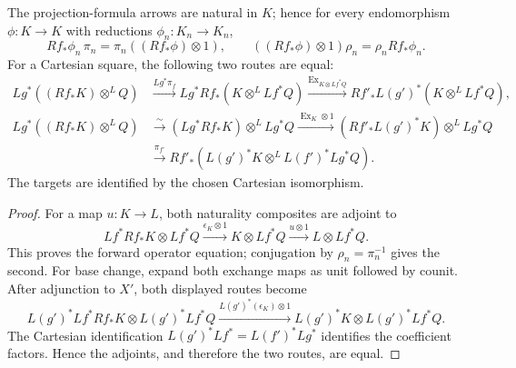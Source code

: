 \begin{lemma}
\label{lemma:weil-pbc-projection-formula-base-change-naturality}
The projection-formula arrows are natural in $K$; hence for every
endomorphism $\phi:K\to K$ with reductions $\phi_n:K_n\to K_n$,
\[
 Rf_*\phi_n\,\pi_n=\pi_n((Rf_*\phi)\otimes1),
 \qquad
 ((Rf_*\phi)\otimes1)\rho_n=\rho_nRf_*\phi_n.
\]
For a Cartesian square, the following two routes are equal:
\[
\begin{aligned}
 Lg^*((Rf_*K)\otimes^LQ)
 &\xrightarrow{Lg^*\pi_f}Lg^*Rf_*(K\otimes^LLf^*Q)
 \xrightarrow{\operatorname{Ex}_{K\otimes Lf^*Q}}
 Rf'_*L(g')^*(K\otimes^LLf^*Q),\\
 Lg^*((Rf_*K)\otimes^LQ)
 &\xrightarrow{\sim}(Lg^*Rf_*K)\otimes^LLg^*Q
 \xrightarrow{\operatorname{Ex}_K\otimes1}
 (Rf'_*L(g')^*K)\otimes^LLg^*Q\\
 &\xrightarrow{\pi_{f'}}
 Rf'_*(L(g')^*K\otimes^LL(f')^*Lg^*Q).
\end{aligned}
\]
The targets are identified by the chosen Cartesian isomorphism.
\end{lemma}
\begin{proof}
For a map $u:K\to L$, both naturality composites are adjoint to
\[
 Lf^*Rf_*K\otimes Lf^*Q
 \xrightarrow{\epsilon_K\otimes1}K\otimes Lf^*Q
 \xrightarrow{u\otimes1}L\otimes Lf^*Q.
\]
This proves the forward operator equation; conjugation by $\rho_n=\pi_n^{-1}$
gives the second.  For base change, expand both exchange maps as unit followed
by counit.  After adjunction to $X'$, both displayed routes become
\[
 L(g')^*Lf^*Rf_*K\otimes L(g')^*Lf^*Q
 \xrightarrow{L(g')^*(\epsilon_K)\otimes1}
 L(g')^*K\otimes L(g')^*Lf^*Q.
\]
The Cartesian identification
$L(g')^*Lf^*=L(f')^*Lg^*$ identifies the coefficient factors.  Hence the
adjoints, and therefore the two routes, are equal.
\end{proof}

